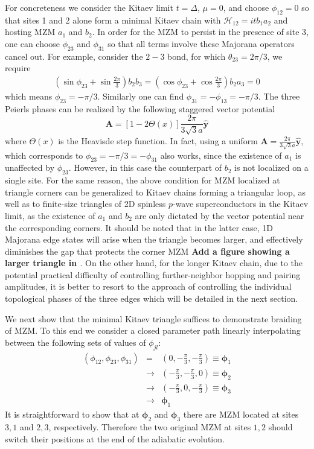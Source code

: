 \documentclass[aps,prb,showpacs,amsmath,twocolumn,amssymb,superscriptaddress]{revtex4-2}
\let\oldhat\hat
\renewcommand{\hat}[1]{\oldhat{\mathbf{#1}}}
\renewcommand{\vec}[1]{\mathbf{#1}}
\newcommand{\de}{\Delta}
\begin{document}
For concreteness we consider the Kitaev limit $t=\de$, $\mu=0$, and choose $\phi_{12} = 0$ so that sites 1 and 2 alone form a minimal Kitaev chain with $\mathcal{H}_{12} = itb_1a_2$ and hosting MZM $a_1$ and $b_2$. In order for the MZM to persist in the presence of site 3, one can choose $\phi_{23}$ and $\phi_{31}$ so that all terms involve these Majorana operators cancel out. For example, consider the $2-3$ bond, for which $\theta_{23} = 2\pi/3$, we require
\begin{align}
  \left(\sin\phi_{23} + \sin\frac{2\pi}{3}\right) b_2 b_3 =\left(\cos\phi_{23} + \cos\frac{2\pi}{3}\right)b_2 a_3 = 0
\end{align}
which means $\phi_{23} = -\pi/3$. Similarly one can find $\phi_{31} =-\phi_{13} = -\pi/3$. The three Peierls phases can be realized by the following staggered vector potential
\begin{equation}
  \vec{A} =\left[1-2\Theta(x)\right]\frac{2 \pi}{3\sqrt{3}a} \hat{y} 
\end{equation}
where $\Theta(x)$ is the Heavisde step function. In fact, using a uniform $\vec{A} =\frac{2 \pi}{3\sqrt{3}a} \hat{y}$, which corresponds to $\phi_{23} = -\pi/3 = -\phi_{31}$ also works, since the existence of $a_1$ is unaffected by $\phi_{23}$. However, in this case the counterpart of $b_2$ is not localized on a single site. For the same reason, the above condition for MZM localized at triangle corners can be generalized to Kitaev chains forming a triangular loop, as well as to finite-size triangles of 2D spinless $p$-wave superconductors in the Kitaev limit, as the existence of $a_1$ and $b_2$ are only dictated by the vector potential near the corresponding corners. It should be noted that in the latter case, 1D Majorana edge states will arise when the triangle becomes larger, and effectively diminishes the gap that protects the corner MZM {\bf Add a figure showing a larger triangle in \cite{supp}}. On the other hand, for the longer Kitaev chain, due to the potential practical difficulty of controlling further-neighbor hopping and pairing amplitudes, it is better to resort to the approach of controlling the individual topological phases of the three edges which will be detailed in the next section. 

We next show that the minimal Kitaev triangle suffices to demonstrate braiding of MZM. To this end we consider a closed parameter path linearly interpolating between the following sets of values of $\phi_{jl}$:
\begin{eqnarray}
    (\phi_{12},\phi_{23},\phi_{31}) &=& \left(0,-\frac{\pi}{3},-\frac{\pi}{3}\right ) \equiv \bm \phi_1 \\\nonumber
    &\rightarrow& \left(-\frac{\pi}{3},-\frac{\pi}{3},0 \right) \equiv \bm \phi_2 \\\nonumber
    &\rightarrow& \left(-\frac{\pi}{3},0,-\frac{\pi}{3} \right) \equiv \bm \phi_3 \\\nonumber
    &\rightarrow& \bm \phi_1
\end{eqnarray}
It is straightforward to show that at $\bm \phi_{2}$ and $\bm \phi_3$ there are MZM located at sites $3,1$ and $2,3$, respectively. Therefore the two original MZM at sites $1,2$ should switch their positions at the end of the adiabatic evolution. 
\end{document}
